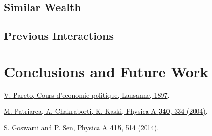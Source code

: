 \documentclass[12pt]{article} %
\begin{document}
\subsection{Similar Wealth}
\subsection{Previous Interactions}
\section{Conclusions and Future Work}


\begin{thebibliography}{2} %
\href{{http://www.institutcoppet.org/2012/05/08/cours-deconomie-politique-1896-de-vilfredo-pareto}}{V. Pareto, Cours d'economie politique, Lausanne, 1897}.

\href{{http://www.sciencedirect.com/science/article/pii/S0378437104004327}}{M. Patriarca, A. Chakraborti, K. Kaski, Physica A \textbf{340}, 334 (2004)}.

\href{{http://www.sciencedirect.com/science/article/pii/S0378437114006967}}{S. Goswami and P. Sen, Physica A \textbf{415}, 514 (2014)}.
\end{thebibliography}
\end{document}
